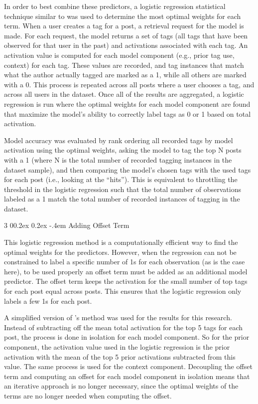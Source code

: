 \documentclass[man,donotrepeattitle]{apa6}
\makeatletter
\renewcommand{\subsubsection}{%
  \@startsection
  {subsubsection}%
  {3}%
  {\parindent}%
  {0\baselineskip \@plus 0.2ex \@minus 0.2ex}%
  {-.4em}%
  {\normalfont\normalsize\bfseries\addperi}}
\makeatother
\begin{document}
In order to best combine these predictors, a logistic regression statistical technique similar to \textcite{Stanley2013} was used to determine the most optimal weights for each term.
When a user creates a tag for a post, a retrieval request for the model is made.
For each request, the model returns a set of tags (all tags that have been observed for that user in the past) and activations associated with each tag.
An activation value is computed for each model component (e.g., prior tag use, context) for each tag.
These values are recorded, and tag instances that match what the author actually tagged are marked as a 1, while all others are marked with a 0.
This process is repeated across all posts where a user chooses a tag, and across all users in the dataset.
Once all of the results are aggregated, a logistic regression is run where the optimal weights for each model component are found that maximize the model's ability to correctly label tags as 0 or 1 based on total activation.

Model accuracy was evaluated by rank ordering all recorded tags by model activation using the optimal weights,
asking the model to tag the top N posts with a 1 (where N is the total number of recorded tagging instances in the dataset sample),
and then comparing the model's chosen tags with the used tags for each post (i.e., looking at the ``hits'').
This is equivalent to throttling the threshold in the logistic regression such that the total number of observations labeled as a 1 match the total number of recorded instances of tagging in the dataset.

\subsubsection{Adding Offset Term}

This logistic regression method is a computationally efficient way to find the optimal weights for the predictors.
However, when the regression can not be constrained to label a specific number of 1s for each observation (as is the case here), to be used properly an offset term must be added as an additional model predictor.
The offset term keeps the activation for the small number of top tags for each post equal across posts.
This ensures that the logistic regression only labels a few 1s for each post.

A simplified version of \textcite{Stanley2013}'s method was used for the results for this research.
Instead of subtracting off the mean total activation for the top 5 tags for each post, the process is done in isolation for each model component.
So for the prior component, the activation value used in the logistic regression is the prior activation with the mean of the top 5 prior activations subtracted from this value.
The same process is used for the context component.
Decoupling the offset term and computing an offset for each model component in isolation means that an iterative approach is no longer necessary,
since the optimal weights of the terms are no longer needed when computing the offset.
\end{document}
